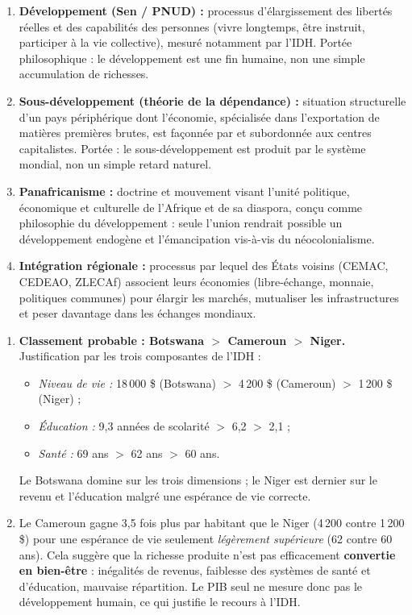 \documentclass[11pt]{article}
\begin{document}
\begin{corrige}
\begin{enumerate}
\item \textbf{Développement (Sen / PNUD) :} processus d'élargissement des libertés réelles et des capabilités des personnes (vivre longtemps, être instruit, participer à la vie collective), mesuré notamment par l'IDH. Portée philosophique : le développement est une fin humaine, non une simple accumulation de richesses.
\item \textbf{Sous-développement (théorie de la dépendance) :} situation structurelle d'un pays périphérique dont l'économie, spécialisée dans l'exportation de matières premières brutes, est façonnée par et subordonnée aux centres capitalistes. Portée : le sous-développement est produit par le système mondial, non un simple retard naturel.
\item \textbf{Panafricanisme :} doctrine et mouvement visant l'unité politique, économique et culturelle de l'Afrique et de sa diaspora, conçu comme philosophie du développement : seule l'union rendrait possible un développement endogène et l'émancipation vis-à-vis du néocolonialisme.
\item \textbf{Intégration régionale :} processus par lequel des États voisins (CEMAC, CEDEAO, ZLECAf) associent leurs économies (libre-échange, monnaie, politiques communes) pour élargir les marchés, mutualiser les infrastructures et peser davantage dans les échanges mondiaux.
\end{enumerate}
\end{corrige}

\begin{corrige}
\begin{enumerate}
\item \textbf{Classement probable : Botswana $>$ Cameroun $>$ Niger.} Justification par les trois composantes de l'IDH :
\begin{itemize}
\item \emph{Niveau de vie :} 18\,000 \$ (Botswana) $>$ 4\,200 \$ (Cameroun) $>$ 1\,200 \$ (Niger) ;
\item \emph{Éducation :} 9,3 années de scolarité $>$ 6,2 $>$ 2,1 ;
\item \emph{Santé :} 69 ans $>$ 62 ans $>$ 60 ans.
\end{itemize}
Le Botswana domine sur les trois dimensions ; le Niger est dernier sur le revenu et l'éducation malgré une espérance de vie correcte.
\item Le Cameroun gagne 3,5 fois plus par habitant que le Niger (4\,200 contre 1\,200 \$) pour une espérance de vie seulement \emph{légèrement supérieure} (62 contre 60 ans). Cela suggère que la richesse produite n'est pas efficacement \textbf{convertie en bien-être} : inégalités de revenus, faiblesse des systèmes de santé et d'éducation, mauvaise répartition. Le PIB seul ne mesure donc pas le développement humain, ce qui justifie le recours à l'IDH.
\end{enumerate}
\end{corrige}
\end{document}
